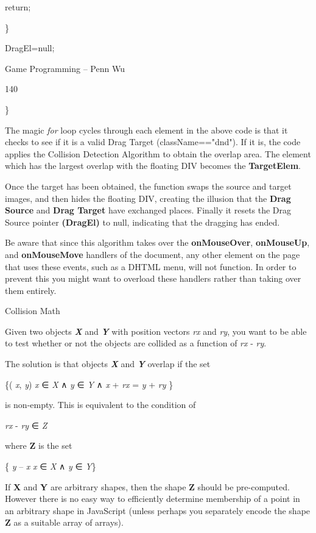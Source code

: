 \documentclass[
]{article}
\begin{document}
return;

\}

DragEl=null;

Game Programming -- Penn Wu

140

\protect\hypertarget{index_split_009.htmlux5cux23p141}{}{}\}

The magic \emph{for} loop cycles through each element in the above code
is that it checks to see if it is a valid Drag Target
(className=="dnd"). If it is, the code applies the Collision Detection
Algorithm to obtain the overlap area. The element which has the largest
overlap with the floating DIV becomes the \textbf{TargetElem}.

Once the target has been obtained, the function swaps the source and
target images, and then hides the floating DIV, creating the illusion
that the \textbf{Drag Source} and \textbf{Drag Target} have exchanged
places. Finally it resets the Drag Source pointer \textbf{(DragEl)} to
null, indicating that the dragging has ended.

Be aware that since this algorithm takes over the \textbf{onMouseOver},
\textbf{onMouseUp}, and \textbf{onMouseMove} handlers of the document,
any other element on the page that uses these events, such as a DHTML
menu, will not function. In order to prevent this you might want to
overload these handlers rather than taking over them entirely.

Collision Math

Given two objects \emph{\textbf{X}} and \emph{\textbf{Y}} with position
vectors \emph{rx} and \emph{ry}, you want to be able to test whether or
not the objects are collided as a function of \emph{rx} - \emph{ry}.

The solution is that objects \emph{\textbf{X}} and \emph{\textbf{Y}}
overlap if the set

\{( \emph{x}, \emph{y}) \textbar{} \emph{x} ∈ \emph{X} ∧ \emph{y} ∈
\emph{Y} ∧ \emph{x} + \emph{rx} = \emph{y} + \emph{ry} \}

is non-empty. This is equivalent to the condition of

\emph{}

\emph{rx} - \emph{ry} ∈ \emph{Z}

where \textbf{Z} is the set

\{ \emph{y} -- \emph{x} \textbar{} \emph{x} ∈ \emph{X} ∧ \emph{y} ∈
\emph{Y}\}

If \textbf{X} and \textbf{Y} are arbitrary shapes, then the shape
\textbf{Z} should be pre-computed. However there is no easy way to
efficiently determine membership of a point in an arbitrary shape in
JavaScript (unless perhaps you separately encode the shape \textbf{Z} as
a suitable array of arrays).
\end{document}
